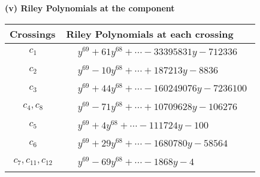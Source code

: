\documentclass[1p]{elsarticle_modified}
\theoremstyle{definition}
\begin{document}
\newpage\renewcommand{\arraystretch}{1}
\flushleft \textbf{(v) Riley Polynomials at the component}\newline \\
\begin{tabular}{m{50pt}|m{274pt}}
Crossings & \hspace{64pt}Riley Polynomials at each crossing \\
\hline $$\begin{aligned}c_{1}\end{aligned}$$&$\begin{aligned}
&y^{69}+61 y^{68}+\cdots-33395831 y-712336
\end{aligned}$\\
\hline $$\begin{aligned}c_{2}\end{aligned}$$&$\begin{aligned}
&y^{69}-10 y^{68}+\cdots+187213 y-8836
\end{aligned}$\\
\hline $$\begin{aligned}c_{3}\end{aligned}$$&$\begin{aligned}
&y^{69}+44 y^{68}+\cdots-160249076 y-7236100
\end{aligned}$\\
\hline $$\begin{aligned}c_{4},c_{8}\end{aligned}$$&$\begin{aligned}
&y^{69}-71 y^{68}+\cdots+10709628 y-106276
\end{aligned}$\\
\hline $$\begin{aligned}c_{5}\end{aligned}$$&$\begin{aligned}
&y^{69}+4 y^{68}+\cdots-111724 y-100
\end{aligned}$\\
\hline $$\begin{aligned}c_{6}\end{aligned}$$&$\begin{aligned}
&y^{69}+29 y^{68}+\cdots-1680780 y-58564
\end{aligned}$\\
\hline $$\begin{aligned}c_{7},c_{11},c_{12}\end{aligned}$$&$\begin{aligned}
&y^{69}-69 y^{68}+\cdots-1868 y-4
\end{aligned}$\\

\end{tabular}
\end{document}
